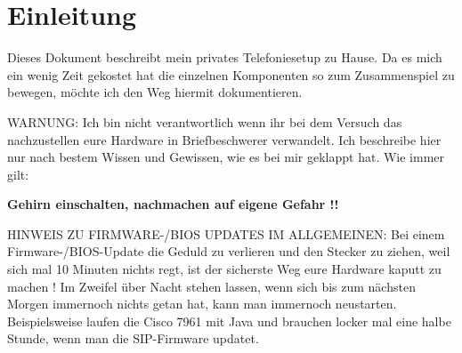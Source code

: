 \documentclass[a4paper,12pt]{scrbook}
\begin{document}


\pagestyle{fancy}

\pagestyle{fancy} 
\fancyhf{}  %
\renewcommand{\headrulewidth}{1pt} 
\fancyhead[EL]{\nouppercase{\leftmark}} %
\fancyhead[OR]{\nouppercase{\leftmark}} %
\fancyfoot[EL]{\thepage} %
\fancyfoot[OR]{\thepage} %



\clearpage
\chapter{Einleitung}
\label{sec:0}
Dieses Dokument beschreibt mein privates Telefoniesetup zu Hause. Da es mich ein wenig Zeit gekostet hat die einzelnen Komponenten
so zum Zusammenspiel zu bewegen, möchte ich den Weg hiermit dokumentieren.

WARNUNG: Ich bin nicht verantwortlich wenn ihr bei dem Versuch das nachzustellen eure Hardware in Briefbeschwerer verwandelt. Ich
beschreibe hier nur nach bestem Wissen und Gewissen, wie es bei mir geklappt hat. Wie immer gilt: 


\textbf{Gehirn einschalten, nachmachen auf eigene Gefahr !!}


HINWEIS ZU FIRMWARE-/BIOS UPDATES IM ALLGEMEINEN: Bei einem Firmware-/BIOS-Update die Geduld zu verlieren und den Stecker zu ziehen,
weil sich mal 10 Minuten nichts regt, ist der sicherste Weg eure Hardware kaputt zu machen ! Im Zweifel über Nacht stehen lassen, wenn
sich bis zum nächsten Morgen immernoch nichts getan hat, kann man immernoch neustarten. Beispielsweise laufen die Cisco 7961 mit Java und
brauchen locker mal eine halbe Stunde, wenn man die SIP-Firmware updatet. 
\end{document}
